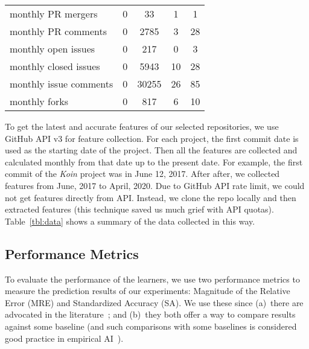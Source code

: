 \documentclass[sigconf,review,anonymous]{acmart}
\begin{document}
\begin{table}[!t]
\begin{adjustbox}{max width=0.48\textwidth}
\begin{tabular}{l|cccc}
\rowcolor[HTML]{FFFFFF} 
{\color[HTML]{000000} monthly PR mergers} & {\color[HTML]{000000} 0} & {\color[HTML]{000000} 33} & {\color[HTML]{000000} 1} & {\color[HTML]{000000} 1} \\
\rowcolor[HTML]{F3F3F3} 
{\color[HTML]{000000} monthly PR comments} & {\color[HTML]{000000} 0} & {\color[HTML]{000000} 2785} & {\color[HTML]{000000} 3} & {\color[HTML]{000000} 28} \\
\rowcolor[HTML]{FFFFFF} 
{\color[HTML]{000000} monthly open issues} & {\color[HTML]{000000} 0} & {\color[HTML]{000000} 217} & {\color[HTML]{000000} 0} & {\color[HTML]{000000} 3} \\
\rowcolor[HTML]{F3F3F3} 
{\color[HTML]{000000} monthly closed issues} & {\color[HTML]{000000} 0} & {\color[HTML]{000000} 5943} & {\color[HTML]{000000} 10} & {\color[HTML]{000000} 28} \\
\rowcolor[HTML]{FFFFFF} 
{\color[HTML]{000000} monthly issue comments} & {\color[HTML]{000000} 0} & {\color[HTML]{000000} 30255} & {\color[HTML]{000000} 26} & {\color[HTML]{000000} 85} \\
\rowcolor[HTML]{F3F3F3} 
{\color[HTML]{000000} monthly forks} & {\color[HTML]{000000} 0} & {\color[HTML]{000000} 817} & {\color[HTML]{000000} 6} & {\color[HTML]{000000} 10}
\end{tabular}
\end{adjustbox}
\end{table}



To get the latest and accurate features
of our selected repositories,  we use GitHub API v3 for feature collection. For each project, the first commit date is
used as the starting date of the project. Then all the features are collected and calculated monthly
from that date up to the present date. For example, the first commit of
the {\it Koin} project was in June 12,  2017.
After after, we collected  features from June, 2017 to April, 2020. Due to GitHub API rate limit, we could not
get features directly from API. Instead, we clone the repo locally and then extracted   features (this technique saved us much grief with API  quotas). 
Table~\ref{tbl:data} shows a summary of the data collected in this way. 


\subsection{Performance Metrics}
To evaluate the performance of the learners, we use two performance metrics to measure the prediction results of our experiments: Magnitude of the Relative Error (MRE) and Standardized Accuracy (SA). We use these since (a)~there are advocated in the literature~\cite{shepperd2012evaluating,sarro2016multi}; and (b)~they both offer a way to compare results against some baseline
(and such  comparisons with some baselines is considered good practice in empirical AI~\cite{Cohen95}).
\end{document}
